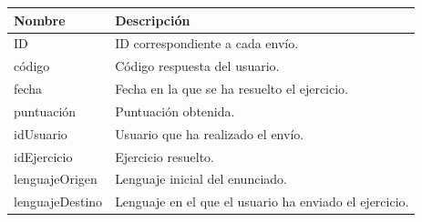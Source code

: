 \begin{description}
\begin{tabularx}{14cm}{|l|X|}
\hline
\textbf{Nombre} & \textbf{Descripción}                                                              \\ \hline
ID       & ID correspondiente a cada envío. \\ \hline
código     & Código respuesta del usuario.                                           \\ \hline
fecha     & Fecha en la que se ha resuelto el ejercicio.                                           \\ \hline
puntuación     & Puntuación obtenida.                                           \\ \hline
idUsuario     & Usuario que ha realizado el envío.                                           \\ \hline
idEjercicio     & Ejercicio resuelto.                                           \\ \hline
lenguajeOrigen     & Lenguaje inicial del enunciado.                                           \\ \hline
lenguajeDestino     & Lenguaje en el que el usuario ha enviado el ejercicio.                                           \\ \hline
\end{tabularx}

\end{description}